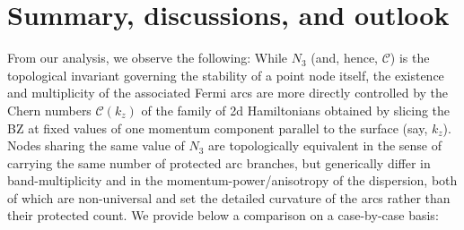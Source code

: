\documentclass[aps,prb,onecolumn, footinbib, 10pt]{revtex4-2}
\begin{document}
\section{Summary, discussions, and outlook}
\label{secsum}

From our analysis, we observe the following: While $N_3$ (and, hence, $\mathcal{C}$) is the topological invariant governing the stability of a point node itself, the existence and multiplicity of the associated Fermi arcs are more directly controlled by the Chern numbers $ \mathcal C(k_z)$ of the family of 2d Hamiltonians obtained by slicing the BZ at fixed values of one momentum component parallel to the surface (say, $k_z$). Nodes sharing the same value of $N_3$ are topologically equivalent in the sense of carrying the same number of protected arc branches, but generically differ in band-multiplicity and in the momentum-power/anisotropy of the dispersion, both of which are non-universal and set the detailed curvature of the arcs rather than their protected count. We provide below a comparison on a case-by-case basis:
\end{document}
